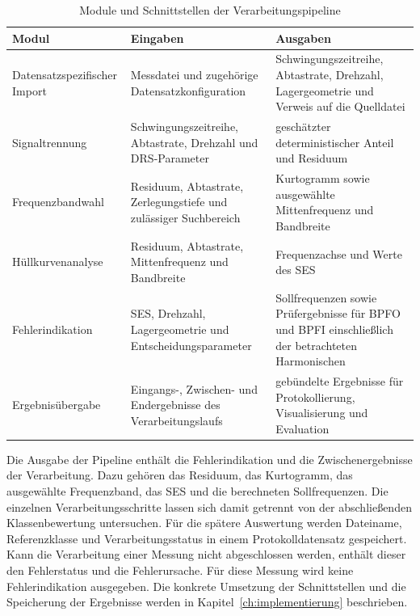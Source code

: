 \begin{table}[H]
  \centering
  \small
  \caption{Module und Schnittstellen der Verarbeitungspipeline}
  \label{tab:pipeline_schnittstellen}
  \begin{tabularx}{\textwidth}{|
      >{\raggedright\arraybackslash}p{3.1cm}|
      >{\raggedright\arraybackslash}X|
      >{\raggedright\arraybackslash}X|}
    \hline
    \textbf{Modul} & \textbf{Eingaben} & \textbf{Ausgaben} \\
    \hline
    Datensatzspezifischer Import &
    Messdatei und zugehörige Datensatzkonfiguration &
    Schwingungszeitreihe, Abtastrate, Drehzahl, Lagergeometrie und Verweis auf
    die Quelldatei \\
    \hline
    Signaltrennung &
    Schwingungszeitreihe, Abtastrate, Drehzahl und DRS-Parameter &
    geschätzter deterministischer Anteil und Residuum \\
    \hline
    Frequenzbandwahl &
    Residuum, Abtastrate, Zerlegungstiefe und zulässiger Suchbereich &
    Kurtogramm sowie ausgewählte Mittenfrequenz und Bandbreite \\
    \hline
    Hüllkurvenanalyse &
    Residuum, Abtastrate, Mittenfrequenz und Bandbreite &
    Frequenzachse und Werte des \acrshort{SES} \\
    \hline
    Fehlerindikation &
    \acrshort{SES}, Drehzahl, Lagergeometrie und
    Entscheidungsparameter &
    Sollfrequenzen sowie Prüfergebnisse für BPFO und BPFI einschließlich
    der betrachteten Harmonischen \\
    \hline
    Ergebnisübergabe &
    Eingangs-, Zwischen- und Endergebnisse des Verarbeitungslaufs &
    gebündelte Ergebnisse für Protokollierung, Visualisierung und Evaluation \\
    \hline
  \end{tabularx}
\end{table}

Die Ausgabe der Pipeline enthält die Fehlerindikation und die
Zwischenergebnisse der Verarbeitung. Dazu gehören das Residuum, das
Kurtogramm, das ausgewählte Frequenzband, das \acrshort{SES} und
die berechneten Sollfrequenzen. Die einzelnen Verarbeitungsschritte lassen
sich damit getrennt von der abschließenden Klassenbewertung untersuchen. Für
die spätere Auswertung werden Dateiname, Referenzklasse und
Verarbeitungsstatus in einem Protokolldatensatz gespeichert. Kann die
Verarbeitung einer Messung nicht abgeschlossen werden, enthält dieser den
Fehlerstatus und die Fehlerursache. Für diese Messung wird keine
Fehlerindikation ausgegeben. Die konkrete Umsetzung der Schnittstellen und
die Speicherung der Ergebnisse werden in
Kapitel~\ref{ch:implementierung} beschrieben.

